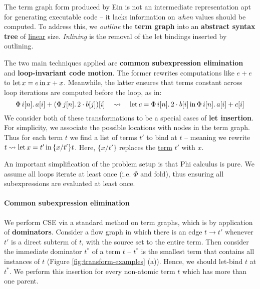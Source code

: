The term graph form produced by Ein is not an intermediate representation apt for generating executable code -- it lacks information on \textit{when} values should be computed. To address this, we \textit{outline} the \textbf{term graph} into an \textbf{abstract syntax tree} of \underline{linear} size.
\textit{Inlining} is the removal of the let bindings inserted by outlining. 

The two main techniques applied are \textbf{common subexpression elimination} and \textbf{loop-invariant code motion}. The former rewrites computations like $e + e$ to  $\mathrm{let}\,{x}={e}\,\mathrm{in}\,{x + x}$. Meanwhile, the latter ensures that terms constant across loop iterations are computed before the loop, as in:
$$ 
\phivec{i}{n}{a[i] + \left( \phivec{j}{n}{2 \cdot b[j]} \right)[i]} \quad\leadsto\quad \philet{c}{\phivec{i}{n}{2 \cdot b[i]}}{\phivec{i}{n}{a[i] + c[i]}} 
$$
We consider both of these transformations to be a special cases of \textbf{let insertion}. 
For simplicity, we associate the possible locations with nodes in the term graph. Thus for each term $t$ we find a list of terms $t'$ to bind at $t$ -- meaning we rewrite $t \leadsto \mathrm{let}\,{x}={t'}\,\mathrm{in}\,{\{x/t'\}t}$. Here, $\{x/t'\}$ replaces the \underline{term} $t'$ with $x$.

An important simplification of the problem setup is that Phi calculus is pure. 
We assume all loops iterate at least once (i.e. $\Phi$ and $\mathrm{fold}$), thus ensuring all subexpressions are evaluated at least once.

\vspace{-1em}
\paragraph{Common subexpression elimination} We perform CSE via a standard method on term graphs, which is by application of \textbf{dominators}. Consider a flow graph in which there is an edge $t \to t'$ whenever $t'$ is a direct subterm of $t$, with the source set to the entire term. Then consider the immediate dominator $t^*$ of a term $t$ -- $t^*$ is the smallest term that contains all instances of $t$ (Figure \ref{fig:transform-examples} (a)). Hence, we should let-bind $t$ at $t^*$. We perform this insertion for every non-atomic term $t$ which has more than one parent. 

